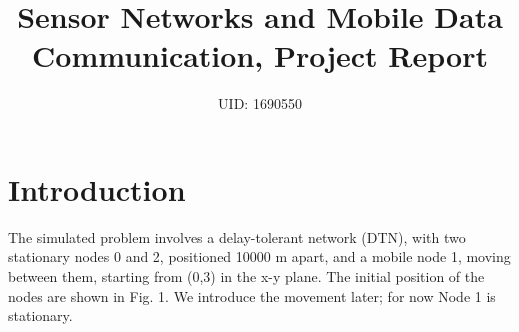 \documentclass[11pt,journal]{article}
\begin{document}
	\title{Sensor Networks and Mobile Data Communication, Project Report}
	
	\author{UID: 1690550}%
	



	
	
	\maketitle
	
	
	
	
	\section{Introduction}
	The simulated problem involves a delay-tolerant network (DTN), with two stationary nodes 0 and 2, positioned 10000 m apart, and a mobile node 1, moving between them, starting from (0,3) in the x-y plane. The initial position of the nodes are shown in Fig. 1. We introduce the movement later; for now Node 1 is stationary.
	
\end{document}
